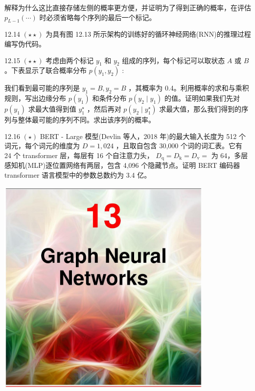 \documentclass[10pt]{article}
\begin{document}
解释为什么这比直接存储左侧的概率更方便，并证明为了得到正确的概率，在评估 \({p}_{L - 1}\left( \cdots \right)\) 时必须省略每个序列的最后一个标记。

12.14 \(\left( {\star  \star  }\right)\) 为具有图 12.13 所示架构的训练好的循环神经网络(RNN)的推理过程编写伪代码。

12.15 \(\left( {\star  \star  }\right)\) 考虑由两个标记 \({y}_{1}\) 和 \({y}_{2}\) 组成的序列，每个标记可以取状态 \(A\) 或 \(B\) 。下表显示了联合概率分布 \(p\left( {{y}_{1},{y}_{2}}\right)\) :

\begin{center}
\end{center}

我们看到最可能的序列是 \({y}_{1} = B,{y}_{2} = B\) ，其概率为 0.4。利用概率的求和与乘积规则，写出边缘分布 \(p\left( {y}_{1}\right)\) 和条件分布 \(p\left( {{y}_{2} \mid  {y}_{1}}\right)\) 的值。证明如果我们先对 \(p\left( {y}_{1}\right)\) 求最大值得到值 \({y}_{1}^{ \star  }\) ，然后再对 \(p\left( {{y}_{2} \mid  {y}_{1}^{ \star  }}\right)\) 求最大值，那么我们得到的序列与整体最可能的序列不同。求出该序列的概率。

12.16 \(\left( \star \right)\) BERT - Large 模型(Devlin 等人，2018 年)的最大输入长度为 512 个词元，每个词元的维度为 \(D = 1,{024}\) ，且取自包含 30,000 个词的词汇表。它有 24 个 transformer 层，每层有 16 个自注意力头， \({D}_{\mathrm{q}} = {D}_{\mathrm{k}} = {D}_{\mathrm{v}} =\) 为 64，多层感知机(MLP)逐位置网络有两层，包含 4,096 个隐藏节点。证明 BERT 编码器 transformer 语言模型中的参数总数约为 3.4 亿。

\begin{center}
\includegraphics[max width=0.8\textwidth]{images/0194e279-9b28-703a-88f4-c3ac21e2010d_426_474_348_1074_1089_0.jpg}
\end{center}
\hspace*{3em} 
\end{document}
